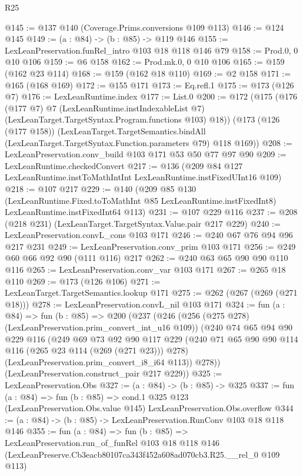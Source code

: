\begin{lexlean}{R25}
\begin{coremodule}
@145 := @137 @140 (Coverage.Prims.conversions @109 @113)
@146 := @124 @145
@149 := (a : @84) -> (b : @85) -> @119 @146
@155 := LexLeanPreservation.funRel_intro @103 @18 @118 @146 @79
@158 := Prod.{0, 0} @10 @106
@159 := @6 @158
@162 := Prod.mk.{0, 0} @10 @106
@165 := @159 (@162 @23 @114)
@168 := @159 (@162 @18 @110)
@169 := @2 @158
@171 := @165 (@168 @169)
@172 := @155 @171
@173 := Eq.refl.{1}
@175 := @173 (@126 @7)
@176 := LexLeanRuntime.index
@177 := List.{0}
@200 := @172
    (@175
      (@176
        (@177 @7)
        @7
        (LexLeanRuntime.instIndexableList @7)
        (LexLeanTarget.TargetSyntax.Program.functions @103)
        @18))
    (@173
      (@126 (@177 @158))
      (LexLeanTarget.TargetSemantics.bindAll
        (LexLeanTarget.TargetSyntax.Function.parameters @79)
        @118
        @169))
@208 := LexLeanPreservation.conv_build @103 @171 @53 @50 @77 @97 @90
@209 := LexLeanRuntime.checkedConvert
@217 := @136 (@209 @84 @127 LexLeanRuntime.instToMathIntInt LexLeanRuntime.instFixedUInt16 @109)
@218 := @107 @217
@229 := @140
    (@209
      @85
      @130
      (LexLeanRuntime.Fixed.toToMathInt @85 LexLeanRuntime.instFixedInt8)
      LexLeanRuntime.instFixedInt64
      @113)
@231 := @107 @229 @116
@237 := @208 (@218 @231) (LexLeanTarget.TargetSyntax.Value.pair @217 @229)
@240 := LexLeanPreservation.convL_cons @103 @171
@246 := @240 @67 @76 @94 @96 @217 @231
@249 := LexLeanPreservation.conv_prim @103 @171
@256 := @249 @60 @66 @92 @90 (@111 @116) @217
@262 := @240 @63 @65 @90 @90 @110 @116
@265 := LexLeanPreservation.conv_var @103 @171
@267 := @265 @18 @110
@269 := @173 (@126 @106)
@271 := LexLeanTarget.TargetSemantics.lookup @171
@275 := @262 (@267 (@269 (@271 @18)))
@278 := LexLeanPreservation.convL_nil @103 @171
@324 := fun (a : @84) =>
  fun (b : @85) =>
  @200
    (@237
      (@246
        (@256 (@275 @278) (LexLeanPreservation.prim_convert_int_u16 @109))
        (@240
          @74
          @65
          @94
          @90
          @229
          @116
          (@249
            @69
            @73
            @92
            @90
            @117
            @229
            (@240 @71 @65 @90 @90 @114 @116 (@265 @23 @114 (@269 (@271 @23))) @278)
            (LexLeanPreservation.prim_convert_i8_i64 @113))
          @278))
      (LexLeanPreservation.construct_pair @217 @229))
@325 := LexLeanPreservation.Obs
@327 := (a : @84) -> (b : @85) -> @325
@337 := fun (a : @84) =>
  fun (b : @85) =>
  cond.{1} @325 @123 (LexLeanPreservation.Obs.value @145) LexLeanPreservation.Obs.overflow
@344 := (a : @84) -> (b : @85) -> LexLeanPreservation.RunConv @103 @18 @118 @146
@355 := fun (a : @84) =>
  fun (b : @85) =>
  LexLeanPreservation.run_of_funRel
    @103
    @18
    @118
    @146
    (LexLeanPreserve.Cb3eacb80107ca343f452a608ad070cb3.R25.__rel_0 @109 @113)
\end{coremodule}
\end{lexlean}
